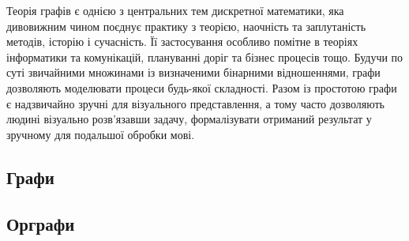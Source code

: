 Теорія графів є однією з центральних тем дискретної математики, яка дивовижним чином поєднує практику з теорією, наочність та заплутаність методів, історію і сучасність. Її застосування особливо помітне в теоріях інформатики та комунікацій, плануванні доріг та бізнес процесів тощо. Будучи по суті звичайними множинами із визначеними бінарними відношеннями, графи дозволяють моделювати процеси будь-якої складності. Разом із простотою графи є надзвичайно зручні для візуального представлення, а тому часто дозволяють людині візуально розв'язавши задачу, формалізувати отриманий результат у зручному для подальшої обробки мові.
\newpage
\subsection{Графи}


\newpage
\subsection{Орграфи}

